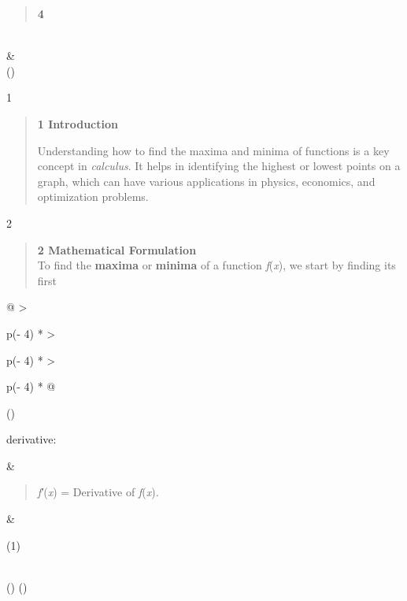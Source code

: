 \documentclass[
]{article}
\begin{document}
\begin{longtable}[]
{\begin{minipage}[t]{\linewidth}
\begin{quote}
\textbf{4}
\end{quote}
\end{minipage}} \\
&
 \\
\bottomrule()
\end{longtable}

1

\begin{quote}
\textbf{1 Introduction}

Understanding how to find the maxima and minima of functions is a key
concept in \emph{calculus}. It helps in identifying the highest or
lowest points on a graph, which can have various applications in
physics, economics, and optimization problems.
\end{quote}

2

\begin{quote}
\textbf{2 Mathematical Formulation}\\
To find the \textbf{maxima} or \textbf{minima} of a function
\emph{f}(\emph{x}), we start by finding its first
\end{quote}

\begin{longtable}[]{@{}
  >{\raggedright\arraybackslash}p{(\columnwidth - 4\tabcolsep) * }
  >{\raggedright\arraybackslash}p{(\columnwidth - 4\tabcolsep) * }
  >{\raggedright\arraybackslash}p{(\columnwidth - 4\tabcolsep) * }@{}}
\toprule()
\begin{minipage}[b]{\linewidth}\raggedright
derivative:
\end{minipage} & \begin{minipage}[b]{\linewidth}\raggedright
\begin{quote}
\emph{f′}(\emph{x}) = Derivative of \emph{f}(\emph{x})\emph{.}
\end{quote}
\end{minipage} & \begin{minipage}[b]{\linewidth}\raggedright
(1)
\end{minipage} \\
\midrule()
\endhead
\bottomrule()
\end{longtable}
\end{document}
